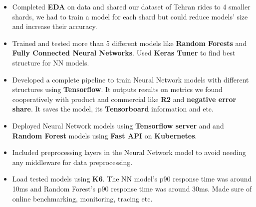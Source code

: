{\begin{itemize}[label=\textbullet]
                  Extended our feature vector size from 4 to 11.
            \item Completed \textbf{EDA} on data and shared our dataset of Tehran rides to 4 smaller shards,
                  we had to train a model for each shard but could reduce models' size and increase their accuracy.
            \item Trained and tested more than 5 different models like \textbf{Random Forests} and \textbf{Fully Connected Neural Networks}. Used \textbf{Keras Tuner} to find best structure for NN models.
            \item Developed a complete pipeline to train Neural Network models with different structures using \textbf{Tensorflow}. It outputs results on metrics we found cooperatively with product and commercial like \textbf{R2} and \textbf{negative error share}. It saves the model, its \textbf{Tensorboard} information and etc.
            \item Deployed Neural Network models using \textbf{Tensorflow server} and and \textbf{Random Forest} models using \textbf{Fast API} on \textbf{Kubernetes}.
            \item Included preprocessing layers in the Neural Network model to avoid needing any middleware for data preprocessing.
            \item Load tested models using \textbf{K6}. The NN model's p90 response time was around 10ms and Random Forest's p90 response time was around 30ms. Made sure of online benchmarking, monitoring, tracing etc.
      \end{itemize}
}

\vspace{.5cm}


